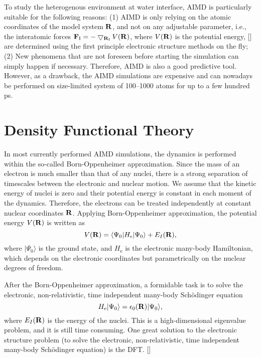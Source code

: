To study the heterogenous environment at water interface, AIMD is particularly suitable for the following reasons:
(1) AIMD is only relying on the atomic coordinates of the model system $\bf R$, and not on any adjustable parameter, 
i.e., the interatomic forces ${\bf F}_{\text{I}}=-\bigtriangledown_{{\bf R}_{\text{I}}}V({\bf R})$, where $V({\bf R})$ is the potential energy, [\cite{VKMP}]
are determined using the first principle electronic structure methods on the fly; 
(2) New phenomena that are not foreseen before starting the simulation can simply happen if necessary.
Therefore, AIMD is also a good predictive tool. 
However, as a drawback, the AIMD simulations are expensive and can nowadays be performed on size-limited system of 100--1000 atoms for up to a few hundred ps. 

\section{Density Functional Theory} \label{section_DFT}
In most currently performed AIMD simulations, the dynamics is performed within the so-called Born-Oppenheimer approximation.
Since the mass of an electron is much smaller than that of any nuclei, there is a strong separation of timescales between the electronic and nuclear motion. 
We assume that the kinetic energy of nuclei is zero and their potential energy is constant in each moment of the dynamics.
Therefore, the electrons can be treated independently at constant nuclear coordinates $\bf R$.
Applying Born-Oppenheimer approximation, the potential energy $V(\bf R)$ is  written as
\begin{equation}
  V({\bf R})=\langle \Psi_0 | H_{\text{e}} | \Psi_0 \rangle + E_{I}({\bf R}),
\label{eq:BO}
\end{equation}
where $|\Psi_0\rangle$ is the ground state, 
and $H_{\text{e}}$ is the electronic many-body Hamiltonian, which depends on the electronic 
coordinates but parametrically on the nuclear degrees of freedom. 

After the Born-Oppenheimer approximation, a formidable task is to solve the electronic, non-relativistic, time independent many-body Sch\"{o}dinger equation
\begin{equation}
H_{\text{e}} |\Psi_0 \rangle = \epsilon_0({\bf R})|\Psi_0 \rangle,
\label{eq:SE}
\end{equation}
where $E_I({\bf R})$ is the energy of the nuclei.
This is a high-dimensional eigenvalue problem, and it is still time consuming. 
One great solution to the electronic structure problem (to solve the electronic, non-relativistic, time independent many-body 
Sch\"{o}dinger equation) is the DFT. [\cite{HK64,KS65}]

